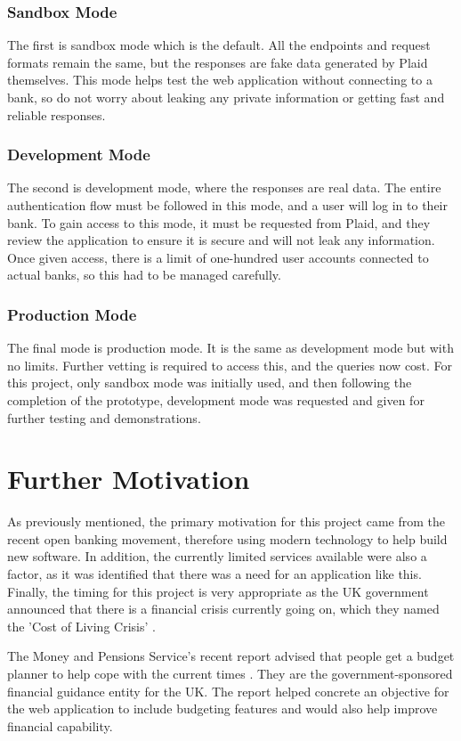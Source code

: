 \subsubsection{Sandbox Mode}
The first is sandbox mode which is the default. All the endpoints and request formats remain the same, but the responses are fake data generated by Plaid themselves. This mode helps test the web application without connecting to a bank, so do not worry about leaking any private information or getting fast and reliable responses.

\subsubsection{Development Mode}
The second is development mode, where the responses are real data. The entire authentication flow must be followed in this mode, and a user will log in to their bank. To gain access to this mode, it must be requested from Plaid, and they review the application to ensure it is secure and will not leak any information. Once given access, there is a limit of one-hundred user accounts connected to actual banks, so this had to be managed carefully.

\subsubsection{Production Mode}
The final mode is production mode. It is the same as development mode but with no limits. Further vetting is required to access this, and the queries now cost. For this project, only sandbox mode was initially used, and then following the completion of the prototype, development mode was requested and given for further testing and demonstrations.

\section{Further Motivation}
\label{sec:further-motivation}
As previously mentioned, the primary motivation for this project came from the recent open banking movement, therefore using modern technology to help build new software. In addition, the currently limited services available were also a factor, as it was identified that there was a need for an application like this. Finally, the timing for this project is very appropriate as the UK government announced that there is a financial crisis currently going on, which they named the 'Cost of Living Crisis' \cite{CostOfLivingCrisisGov}.

The Money and Pensions Service's recent report advised that people get a budget planner to help cope with the current times \cite{MaPS}. They are the government-sponsored financial guidance entity for the UK. The report helped concrete an objective for the web application to include budgeting features and would also help improve financial capability.